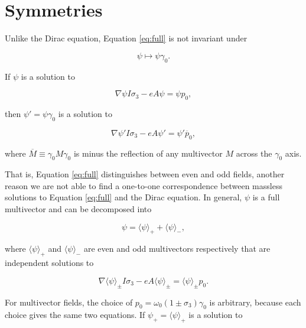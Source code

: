 \documentclass{article}
\begin{document}
  \section{Symmetries} \label{symmetries}

  Unlike the Dirac equation, Equation \ref{eq:full} is not invariant under

  \begin{equation}
    \psi \mapsto \psi \gamma_0.\label{eq:g0conjugation}
  \end{equation}

  If $\psi$ is a solution to

  \begin{equation}
    \nabla \psi I \sigma_3 - e A \psi = \psi p_0,\label{eq:plus}
  \end{equation}

  then $\psi' = \psi \gamma_0$ is a solution to

  \begin{equation}
    \nabla \psi' I \sigma_3 - e A \psi' = \psi' \overline p_0, \label{eq:minus}
  \end{equation}

  where $\overline M \equiv \gamma_0M\gamma_0$ is minus the reflection of any multivector $M$ across the $\gamma_0$ axis.

  That is, Equation \ref{eq:full} distinguishes between even and odd fields, another reason we are not able to find a one-to-one correspondence between massless solutions to Equation \ref{eq:full} and the Dirac equation. In general, $\psi$ is a full multivector and can be decomposed into

  \begin{equation}
    \psi = \langle \psi \rangle_+ + \langle \psi \rangle_-,
  \end{equation}

  where $\langle \psi \rangle_+$ and $\langle \psi \rangle_-$ are even and odd multivectors respectively that are independent solutions to

  \begin{equation}
    \nabla \langle \psi \rangle_\pm I \sigma_3 - e A \langle \psi \rangle_\pm = \langle \psi \rangle_\pm p_0.\label{eq:decoupled}
  \end{equation}

  For multivector fields, the choice of $p_0 = \omega_0 (1 \pm \sigma_3) \gamma_0$ is arbitrary, because each choice gives the same two equations. If $\psi_+ = \langle \psi \rangle_+$ is a solution to
\end{document}
